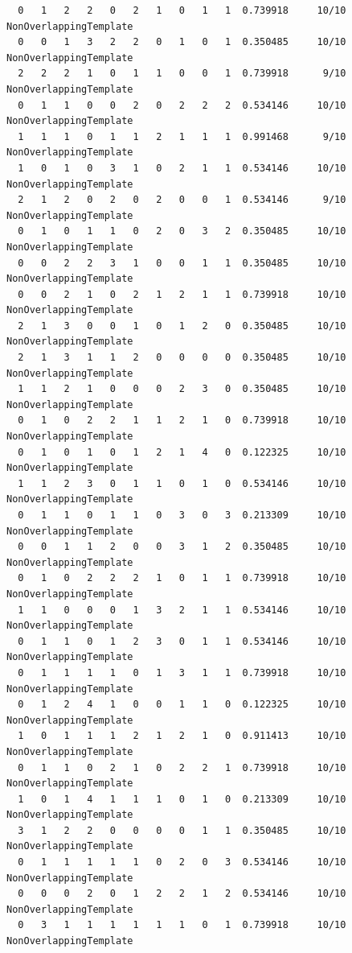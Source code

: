 \documentclass[12pt, titlepage]{report}
\theoremstyle{definition}
\begin{document}
{\begin{verbatim}
  0   1   2   2   0   2   1   0   1   1  0.739918     10/10      NonOverlappingTemplate
  0   0   1   3   2   2   0   1   0   1  0.350485     10/10      NonOverlappingTemplate
  2   2   2   1   0   1   1   0   0   1  0.739918      9/10      NonOverlappingTemplate
  0   1   1   0   0   2   0   2   2   2  0.534146     10/10      NonOverlappingTemplate
  1   1   1   0   1   1   2   1   1   1  0.991468      9/10      NonOverlappingTemplate
  1   0   1   0   3   1   0   2   1   1  0.534146     10/10      NonOverlappingTemplate
  2   1   2   0   2   0   2   0   0   1  0.534146      9/10      NonOverlappingTemplate
  0   1   0   1   1   0   2   0   3   2  0.350485     10/10      NonOverlappingTemplate
  0   0   2   2   3   1   0   0   1   1  0.350485     10/10      NonOverlappingTemplate
  0   0   2   1   0   2   1   2   1   1  0.739918     10/10      NonOverlappingTemplate
  2   1   3   0   0   1   0   1   2   0  0.350485     10/10      NonOverlappingTemplate
  2   1   3   1   1   2   0   0   0   0  0.350485     10/10      NonOverlappingTemplate
  1   1   2   1   0   0   0   2   3   0  0.350485     10/10      NonOverlappingTemplate
  0   1   0   2   2   1   1   2   1   0  0.739918     10/10      NonOverlappingTemplate
  0   1   0   1   0   1   2   1   4   0  0.122325     10/10      NonOverlappingTemplate
  1   1   2   3   0   1   1   0   1   0  0.534146     10/10      NonOverlappingTemplate
  0   1   1   0   1   1   0   3   0   3  0.213309     10/10      NonOverlappingTemplate
  0   0   1   1   2   0   0   3   1   2  0.350485     10/10      NonOverlappingTemplate
  0   1   0   2   2   2   1   0   1   1  0.739918     10/10      NonOverlappingTemplate
  1   1   0   0   0   1   3   2   1   1  0.534146     10/10      NonOverlappingTemplate
  0   1   1   0   1   2   3   0   1   1  0.534146     10/10      NonOverlappingTemplate
  0   1   1   1   1   0   1   3   1   1  0.739918     10/10      NonOverlappingTemplate
  0   1   2   4   1   0   0   1   1   0  0.122325     10/10      NonOverlappingTemplate
  1   0   1   1   1   2   1   2   1   0  0.911413     10/10      NonOverlappingTemplate
  0   1   1   0   2   1   0   2   2   1  0.739918     10/10      NonOverlappingTemplate
  1   0   1   4   1   1   1   0   1   0  0.213309     10/10      NonOverlappingTemplate
  3   1   2   2   0   0   0   0   1   1  0.350485     10/10      NonOverlappingTemplate
  0   1   1   1   1   1   0   2   0   3  0.534146     10/10      NonOverlappingTemplate
  0   0   0   2   0   1   2   2   1   2  0.534146     10/10      NonOverlappingTemplate
  0   3   1   1   1   1   1   1   0   1  0.739918     10/10      NonOverlappingTemplate

\end{verbatim}}
\end{document}
